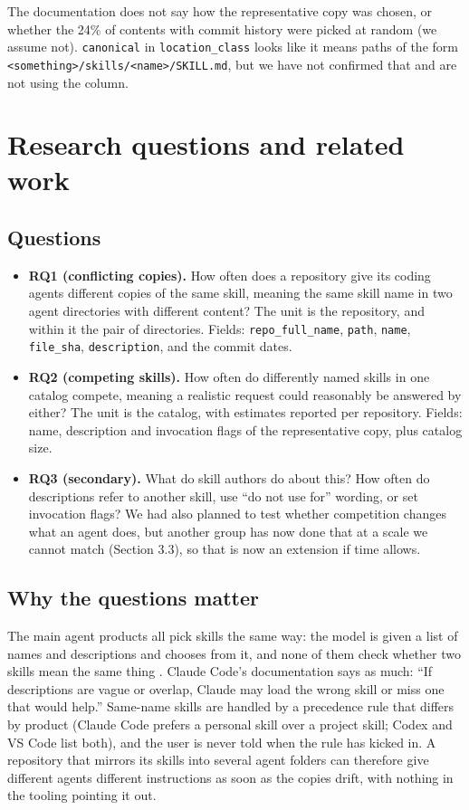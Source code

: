 \documentclass[11pt]{article}
\begin{document}
The documentation does not say how the representative copy was chosen, or whether the 24\% of contents with commit
history were picked at random (we assume not). \texttt{canonical} in \texttt{location\_class} looks like it means paths of
the form \texttt{<something>/skills/<name>/SKILL.md}, but we have not confirmed that and are not using the column.

\section{Research questions and related work}

\subsection{Questions}
\begin{itemize}
  \item \textbf{RQ1 (conflicting copies).} How often does a repository give its coding agents different copies of the same
    skill, meaning the same skill name in two agent directories with different content? The unit is the repository, and
    within it the pair of directories. Fields: \texttt{repo\_full\_name}, \texttt{path}, \texttt{name}, \texttt{file\_sha},
    \texttt{description}, and the commit dates.
  \item \textbf{RQ2 (competing skills).} How often do differently named skills in one catalog compete, meaning a realistic
    request could reasonably be answered by either? The unit is the catalog, with estimates reported per repository. Fields:
    name, description and invocation flags of the representative copy, plus catalog size.
  \item \textbf{RQ3 (secondary).} What do skill authors do about this? How often do descriptions refer to another skill, use
    ``do not use for'' wording, or set invocation flags? We had also planned to test whether competition changes what an agent
    does, but another group has now done that at a scale we cannot match (Section 3.3), so that is now an extension if time
    allows.
\end{itemize}

\subsection{Why the questions matter}
The main agent products all pick skills the same way: the model is given a list of names and descriptions and chooses from
it, and none of them check whether two skills mean the same thing
\cite{claudecodeskills2026,codexskills2026,agentskillsspec2026}. Claude Code's documentation says as much: ``If descriptions
are vague or overlap, Claude may load the wrong skill or miss one that would help.'' Same-name skills are handled by a
precedence rule that differs by product (Claude Code prefers a personal skill over a project skill; Codex and VS Code list
both), and the user is never told when the rule has kicked in. A repository that mirrors its skills into several agent
folders can therefore give different agents different instructions as soon as the copies drift, with nothing in the tooling
pointing it out.
\end{document}
